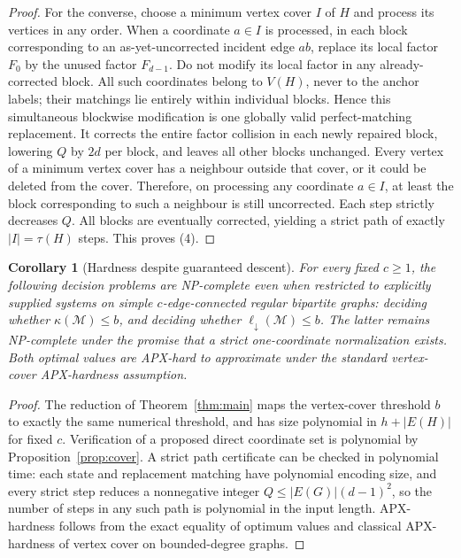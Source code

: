 \documentclass[10pt]{article}
\newtheorem{corollary}[theorem]{Corollary}
\newcommand{\M}{\mathcal M}
\begin{document}
\begin{proof}
For the converse, choose a minimum vertex cover $I$ of $H$ and process its vertices in any order. When a coordinate $a\in I$ is processed, in each block corresponding to an as-yet-uncorrected incident edge $ab$, replace its local factor $F_0$ by the unused factor $F_{d-1}$. Do not modify its local factor in any already-corrected block. All such coordinates belong to $V(H)$, never to the anchor labels; their matchings lie entirely within individual blocks. Hence this simultaneous blockwise modification is one globally valid perfect-matching replacement. It corrects the entire factor collision in each newly repaired block, lowering $Q$ by $2d$ per block, and leaves all other blocks unchanged. Every vertex of a minimum vertex cover has a neighbour outside that cover, or it could be deleted from the cover. Therefore, on processing any coordinate $a\in I$, at least the block corresponding to such a neighbour is still uncorrected. Each step strictly decreases $Q$. All blocks are eventually corrected, yielding a strict path of exactly $|I|=\tau(H)$ steps. This proves (4).
\end{proof}

\begin{corollary}[Hardness despite guaranteed descent]\label{cor:hard}
For every fixed $c\ge1$, the following decision problems are NP-complete even when restricted to explicitly supplied systems on simple $c$-edge-connected regular bipartite graphs: deciding whether $\kappa(\M)\le b$, and deciding whether $\ell_\downarrow(\M)\le b$. The latter remains NP-complete under the promise that a strict one-coordinate normalization exists. Both optimal values are APX-hard to approximate under the standard vertex-cover APX-hardness assumption.
\end{corollary}
\begin{proof}
The reduction of Theorem~\ref{thm:main} maps the vertex-cover threshold $b$ to exactly the same numerical threshold, and has size polynomial in $h+|E(H)|$ for fixed $c$. Verification of a proposed direct coordinate set is polynomial by Proposition~\ref{prop:cover}. A strict path certificate can be checked in polynomial time: each state and replacement matching have polynomial encoding size, and every strict step reduces a nonnegative integer $Q\le |E(G)|(d-1)^2$, so the number of steps in any such path is polynomial in the input length. APX-hardness follows from the exact equality of optimum values and classical APX-hardness of vertex cover on bounded-degree graphs.
\end{proof}
\end{document}
